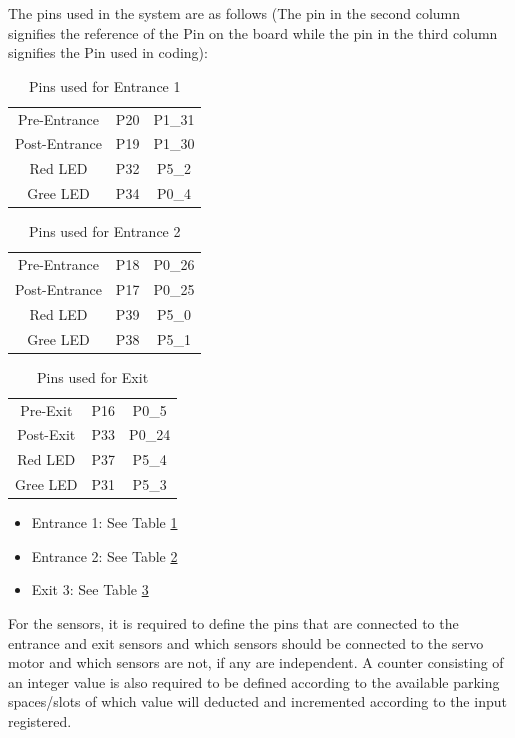 \documentclass[11pt,a4paper,twocolumn]{article}
\begin{document}
The pins used in the system are as follows (The pin in the second column signifies the reference of the Pin on the board while the pin in the third column signifies the Pin used in coding):


	
	\begin{table}
		\centering
	\begin{tabular}{ c c c }
		Pre-Entrance & P20 & P1\_31 \\ 
		Post-Entrance & P19 & P1\_30 \\  
		Red LED & P32 & P5\_2\\
		Gree LED &P34 & P0\_4    
	\end{tabular}
	\caption{Pins used for Entrance 1}
	\label{tab:2}
	\end{table}
	
	\begin{table}
		\centering
	\begin{tabular}{ c c c }
	Pre-Entrance & P18 & P0\_26 \\ 
	Post-Entrance & P17 & P0\_25 \\  
	Red LED & P39 & P5\_0\\
	Gree LED &P38 & P5\_1  
	 \end{tabular}
 		\caption{Pins used for Entrance 2}
 		\label{tab:3}
    \end{table}

	\begin{table}
		\centering
	\begin{tabular}{ c c c }
    Pre-Exit & P16 & P0\_5 \\ 
    Post-Exit & P33 & P0\_24 \\  
    Red LED & P37 & P5\_4\\
    Gree LED &P31 & P5\_3   
	\end{tabular}
	\caption{Pins used for Exit}
	\label{tab:4}
    \end{table}


\begin{itemize}
	\item Entrance 1: See Table \ref{tab:2}
	\item Entrance 2: See Table \ref{tab:3}
	\item Exit 3: See Table \ref{tab:4}
\end{itemize}

For the sensors, it is required to define the pins that are connected to the entrance and exit
sensors and which sensors should be connected to the servo motor and which sensors are not, if any are independent. A counter consisting of an integer value
is also required to be defined according to the available parking spaces/slots of which value will deducted and incremented according to the input registered.
\end{document}
